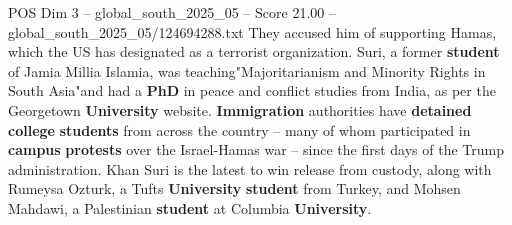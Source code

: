 \begin{textsample}{POS Dim 3 – global\_south\_2025\_05 – Score 21.00 – global\_south\_2025\_05/124694288.txt}
They accused him of supporting Hamas, which the US has designated as a terrorist organization.
Suri, a former \textbf{student} of Jamia Millia Islamia, was teaching"Majoritarianism and Minority Rights in South Asia"and had a \textbf{PhD} in peace and conflict studies from India, as per the Georgetown \textbf{University} website. \textbf{Immigration} authorities have \textbf{detained} \textbf{college} \textbf{students} from across the country -- many of whom participated in \textbf{campus} \textbf{protests} over the Israel-Hamas war -- since the first days of the Trump administration.
Khan Suri is the latest to win release from custody, along with Rumeysa Ozturk, a Tufts \textbf{University} \textbf{student} from Turkey, and Mohsen Mahdawi, a Palestinian \textbf{student} at Columbia \textbf{University}.

\end{textsample}
